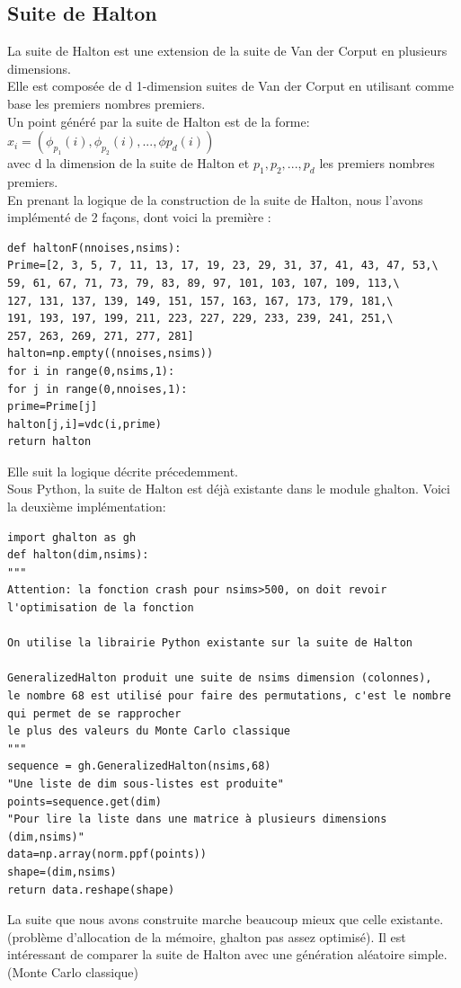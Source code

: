\documentclass[12pt]{report}
\begin{document}
\subsection{Suite de Halton}

La suite de Halton est une extension de la suite de Van der Corput en plusieurs dimensions.\\
Elle est composée de d 1-dimension suites de Van der Corput en utilisant comme base les premiers nombres premiers.\\
Un point généré par la suite de Halton est de la forme:\\
$x_i=(\phi_{p_1}(i),\phi_{p_2}(i),...,\phi{p_d}(i))$\\
avec d la dimension de la suite de Halton et $p_1,p_2,...,p_d$ les premiers nombres premiers.\\
En prenant la logique de la construction de la suite de Halton, nous l'avons implémenté de 2 façons, dont voici la première :\\
\begin{lstlisting}
def haltonF(nnoises,nsims):
Prime=[2, 3, 5, 7, 11, 13, 17, 19, 23, 29, 31, 37, 41, 43, 47, 53,\
59, 61, 67, 71, 73, 79, 83, 89, 97, 101, 103, 107, 109, 113,\
127, 131, 137, 139, 149, 151, 157, 163, 167, 173, 179, 181,\
191, 193, 197, 199, 211, 223, 227, 229, 233, 239, 241, 251,\
257, 263, 269, 271, 277, 281]
halton=np.empty((nnoises,nsims))
for i in range(0,nsims,1):
for j in range(0,nnoises,1):
prime=Prime[j]
halton[j,i]=vdc(i,prime)
return halton
\end{lstlisting}
Elle suit la logique décrite précedemment.\\
\newpage
Sous Python, la suite de Halton est déjà existante dans le module ghalton. Voici la deuxième implémentation:\\
\begin{lstlisting}
import ghalton as gh
def halton(dim,nsims):
"""
Attention: la fonction crash pour nsims>500, on doit revoir l'optimisation de la fonction

On utilise la librairie Python existante sur la suite de Halton

GeneralizedHalton produit une suite de nsims dimension (colonnes),
le nombre 68 est utilisé pour faire des permutations, c'est le nombre qui permet de se rapprocher
le plus des valeurs du Monte Carlo classique
"""
sequence = gh.GeneralizedHalton(nsims,68)
"Une liste de dim sous-listes est produite"
points=sequence.get(dim)
"Pour lire la liste dans une matrice à plusieurs dimensions (dim,nsims)"
data=np.array(norm.ppf(points))
shape=(dim,nsims)
return data.reshape(shape)
\end{lstlisting}
La suite que nous avons construite marche beaucoup mieux que celle existante. (problème d'allocation de la mémoire, ghalton pas assez optimisé).
\newpage
Il est intéressant de comparer la suite de Halton avec une génération aléatoire simple. (Monte Carlo classique)\\
\end{document}
